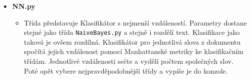 \documentclass[
12pt,
a4paper,
pdftex,
czech,
titlepage
]{report}
\begin{document}
\begin{itemize}
{\begin{itemize}
\end{itemize}}
\item{\textbf{NN.py}
\begin{itemize}
\item{Třída představuje Klasifikátor s nejmenší vzdáleností. Parametry dostane stejné jako třída \texttt{NaiveBayes.py} a stejně i rozdělí text. Klasifikace jako taková je ovšem rozdílná. Klasifikátor pro jednotlivá slova z dokumentu spočítá jejich vzdálenost pomocí Manhattanské metriky ke klasifikačním třídám. Jednotlivé vzdálenosti sečte a vydělí počtem společných slov. Poté opět vybere nejpravděpodobnější třídy a vypíše je do konzole.}
\end{itemize}}
\end{itemize}





\end{document}
